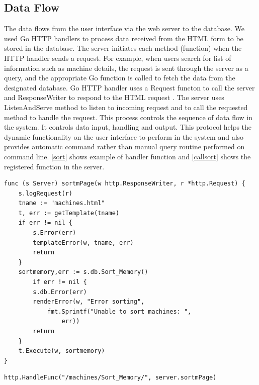 \subsection{Data Flow}
The data flows from the user interface via the web server to the database. We used Go HTTP handlers to process data received from the HTML form to be stored in the database. The server initiates each method (function) when the HTTP handler sends a request. For example, when users search for list of information such as machine details, the request is sent through the server as a query, and the appropriate Go function is called to fetch the data from the designated database. Go HTTP handler uses a Request functon to call the server and  ResponseWriter to respond to the HTML request \cite{Gohttp}. The server uses ListenAndServe method to listen to incoming request and to call the requested method to handle the request. This process controls the sequence of data flow in the system. It controls data input, handling and output. This protocol helps the dynamic functionality on the user interface to perform in the system and also provides automatic command rather than manual query routine performed on command line. \autoref{sort} shows example of  handler function and \autoref{callsort} shows the registered function in the server.
\lstset{basicstyle=\footnotesize\ttfamily,breaklines=true}
\lstset{framextopmargin=50pt,frame=bottomline}
\begin{lstlisting}[caption=Sort Memory function in the handler, label=sort]
func (s Server) sortmPage(w http.ResponseWriter, r *http.Request) {
	s.logRequest(r)
	tname := "machines.html"
	t, err := getTemplate(tname)
	if err != nil {
		s.Error(err)
		templateError(w, tname, err)
		return
	}
	sortmemory,err := s.db.Sort_Memory()
		if err != nil {
		s.db.Error(err)
		renderError(w, "Error sorting",
			fmt.Sprintf("Unable to sort machines: ",
				err))
		return
	}
	t.Execute(w, sortmemory)
}
\end{lstlisting}

\lstset{basicstyle=\footnotesize\ttfamily,breaklines=true}
\lstset{framextopmargin=50pt,frame=bottomline}
\begin{lstlisting}[caption=Calling Sort Memory function, label=callsort]
http.HandleFunc("/machines/Sort_Memory/", server.sortmPage)
\end{lstlisting}

